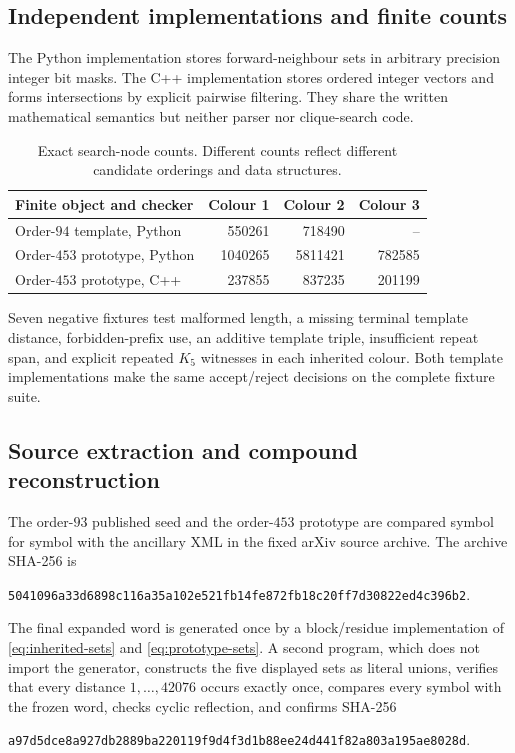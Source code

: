 \documentclass[11pt]{article}
\theoremstyle{definition}
\theoremstyle{remark}
\newcommand{\sha}[1]{\begingroup\ttfamily\scriptsize\urlstyle{same}\nolinkurl{#1}\endgroup}
\begin{document}
\subsection{Independent implementations and finite counts}

The Python implementation stores forward-neighbour sets in arbitrary
precision integer bit masks.  The C++ implementation stores ordered integer
vectors and forms intersections by explicit pairwise filtering.  They share
the written mathematical semantics but neither parser nor clique-search
code.

\begin{table}[htbp]
\centering
\caption{Exact search-node counts.  Different counts reflect different
candidate orderings and data structures.}
\label{tab:nodes}
\begin{tabular}{@{}lrrr@{}}
\toprule
Finite object and checker & Colour 1 & Colour 2 & Colour 3\\
\midrule
Order-$94$ template, Python & 550261 & 718490 & --\\
Order-$453$ prototype, Python & 1040265 & 5811421 & 782585\\
Order-$453$ prototype, C++ & 237855 & 837235 & 201199\\
\bottomrule
\end{tabular}
\end{table}

Seven negative fixtures test malformed length, a missing terminal template
distance, forbidden-prefix use, an additive template triple, insufficient
repeat span, and explicit repeated $K_5$ witnesses in each inherited colour.
Both template implementations make the same accept/reject decisions on the
complete fixture suite.

\subsection{Source extraction and compound reconstruction}

The order-$93$ published seed and the order-$453$ prototype are compared
symbol for symbol with the ancillary XML in the fixed arXiv source archive.
The archive SHA-256 is
\begin{center}
\sha{5041096a33d6898c116a35a102e521fb14fe872fb18c20ff7d30822ed4c396b2}.
\end{center}

The final expanded word is generated once by a block/residue implementation
of \eqref{eq:inherited-sets} and \eqref{eq:prototype-sets}.  A second program,
which does not import the generator, constructs the five displayed sets as
literal unions, verifies that every distance $1,\ldots,42076$ occurs exactly
once, compares every symbol with the frozen word, checks cyclic reflection,
and confirms SHA-256
\begin{center}
\sha{a97d5dce8a927db2889ba220119f9d4f3d1b88ee24d441f82a803a195ae8028d}.
\end{center}
\end{document}
